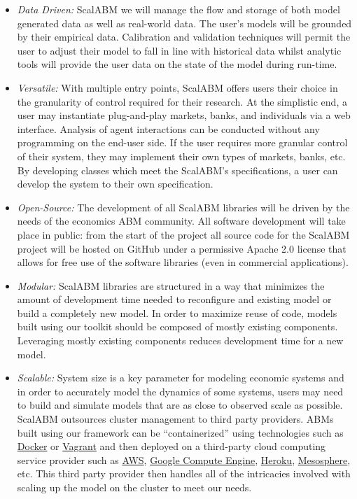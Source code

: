 \documentclass[a4paper]{article}
\begin{document}
\begin{itemize}

\item \textit{Data Driven:} ScalABM we will manage the flow and storage of both model generated data as well as real-world data. The user's models will be grounded by their empirical data. Calibration and validation techniques will permit the user to adjust their model to fall in line with historical data whilst analytic tools will provide the user data on the state of the model during run-time.

\item\textit{Versatile:} With multiple entry points, ScalABM offers users their choice in the granularity of control required for their research. At the simplistic end, a user may instantiate plug-and-play markets, banks, and individuals via a web interface. Analysis of agent interactions can be conducted without any programming on the end-user side. If the user requires more granular control of their system, they may implement their own types of markets, banks, etc. By developing classes which meet the ScalABM's specifications, a user can develop the system to their own specification.

\item \textit{Open-Source:} The development of all ScalABM libraries will be driven by the needs of the economics ABM community. All software development will take place in public: from the start of the project all source code for the ScalABM project will be hosted on GitHub under a permissive Apache 2.0 license that allows for free use of the software libraries (even in commercial applications).

\item \textit{Modular:} ScalABM libraries are structured in a way that minimizes the amount of development time needed to reconfigure and existing model or build a completely new model. In order to maximize reuse of code, models built using our toolkit should be composed of mostly existing components. Leveraging mostly existing components reduces development time for a new model.

\item \textit{Scalable:} System size is a key parameter for modeling economic systems and in order to accurately model the dynamics of some systems, users may need to build and simulate models that are as close to observed scale as possible. ScalABM outsources cluster management to third party providers. ABMs built using our framework can be ``containerized'' using technologies such as \href{https://www.docker.com/}{Docker} or \href{https://www.vagrantup.com/}{Vagrant} and then deployed on a third-party cloud computing service provider such as \href{http://aws.amazon.com/}{AWS}, \href{https://cloud.google.com/compute/}{Google Compute Engine}, \href{https://www.heroku.com/}{Heroku}, \href{https://mesosphere.com/}{Mesosphere}, etc. This third party provider then handles all of the intricacies involved with scaling up the model on the cluster to meet our needs.
    

\end{itemize}
\end{document}
